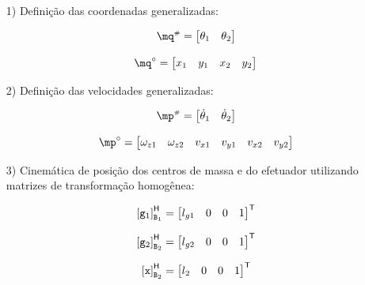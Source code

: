 \documentclass[a4paper,11pt,brazil,fleqn]{article}
\begin{document}
\begin{itemize}
\item[1)] Defini\c{c}\~ao das coordenadas generalizadas:

\begin{equation}
\mq\ssh = \begin{bmatrix}
\theta_1 & \theta_2
\end{bmatrix}
\end{equation}

\begin{equation}
\mq\cir = \begin{bmatrix}
x_1 & y_1 & x_2 & y_2
\end{bmatrix}
\end{equation}

\item[2)] Defini\c{c}\~ao das velocidades generalizadas:

\begin{equation}
\mp\ssh = \begin{bmatrix}
\dot{\theta}_1 & \dot{\theta}_2
\end{bmatrix}
\end{equation}

\begin{equation}
\mp\cir = \begin{bmatrix}
\omega_{z1} & \omega_{z2} & v_{x1} & v_{y1} & v_{x2} & v_{y2}
\end{bmatrix}
\end{equation}

\item[3)] Cinem\'atica de posi\c{c}\~ao dos centros de massa e do efetuador utilizando matrizes de transforma\c{c}\~ao homog\^enea:

\begin{equation}
\left[ \mathtt{g}_1 \right]^\mathsf{H}_{\mathtt{B}_1}  =
\begin{bmatrix} 
l_{g1} & 0 & 0 & 1
\end{bmatrix}^{\mathsf{T}}
\end{equation}

\begin{equation}
\left[ \mathtt{g}_2 \right]^\mathsf{H}_{\mathtt{B}_2}  =
\begin{bmatrix} 
l_{g2} & 0 & 0 & 1
\end{bmatrix}^{\mathsf{T}}
\end{equation}

\begin{equation}
\left[ \mathtt{x} \right]^\mathsf{H}_{\mathtt{B}_2}  =
\begin{bmatrix} 
l_2 & 0 & 0 & 1
\end{bmatrix}^{\mathsf{T}}
\end{equation}


\end{itemize}
\end{document}
